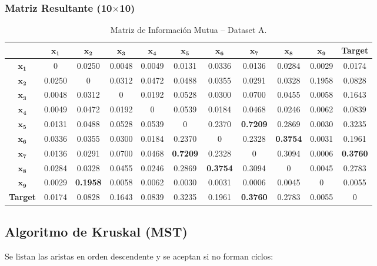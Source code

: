 \documentclass[12pt,a4paper]{article}
\begin{document}
\subsubsection{Matriz Resultante (10$\times$10)}

\begin{table}[H]
    \centering
    \footnotesize
    \begin{tabular}{c|cccccccccc}
        \toprule
        & $\mathbf{x_1}$ & $\mathbf{x_2}$ & $\mathbf{x_3}$ & $\mathbf{x_4}$ & $\mathbf{x_5}$ & $\mathbf{x_6}$ & $\mathbf{x_7}$ & $\mathbf{x_8}$ & $\mathbf{x_9}$ & \textbf{Target} \\
        \midrule
        $\mathbf{x_1}$ & 0 & 0.0250 & 0.0048 & 0.0049 & 0.0131 & 0.0336 & 0.0136 & 0.0284 & 0.0029 & 0.0174 \\
        $\mathbf{x_2}$ & 0.0250 & 0 & 0.0312 & 0.0472 & 0.0488 & 0.0355 & 0.0291 & 0.0328 & 0.1958 & 0.0828 \\
        $\mathbf{x_3}$ & 0.0048 & 0.0312 & 0 & 0.0192 & 0.0528 & 0.0300 & 0.0700 & 0.0455 & 0.0058 & 0.1643 \\
        $\mathbf{x_4}$ & 0.0049 & 0.0472 & 0.0192 & 0 & 0.0539 & 0.0184 & 0.0468 & 0.0246 & 0.0062 & 0.0839 \\
        $\mathbf{x_5}$ & 0.0131 & 0.0488 & 0.0528 & 0.0539 & 0 & 0.2370 & \textbf{0.7209} & 0.2869 & 0.0030 & 0.3235 \\
        $\mathbf{x_6}$ & 0.0336 & 0.0355 & 0.0300 & 0.0184 & 0.2370 & 0 & 0.2328 & \textbf{0.3754} & 0.0031 & 0.1961 \\
        $\mathbf{x_7}$ & 0.0136 & 0.0291 & 0.0700 & 0.0468 & \textbf{0.7209} & 0.2328 & 0 & 0.3094 & 0.0006 & \textbf{0.3760} \\
        $\mathbf{x_8}$ & 0.0284 & 0.0328 & 0.0455 & 0.0246 & 0.2869 & \textbf{0.3754} & 0.3094 & 0 & 0.0045 & 0.2783 \\
        $\mathbf{x_9}$ & 0.0029 & \textbf{0.1958} & 0.0058 & 0.0062 & 0.0030 & 0.0031 & 0.0006 & 0.0045 & 0 & 0.0055 \\
        \textbf{Target} & 0.0174 & 0.0828 & 0.1643 & 0.0839 & 0.3235 & 0.1961 & \textbf{0.3760} & 0.2783 & 0.0055 & 0 \\
        \bottomrule
    \end{tabular}
    \caption{Matriz de Información Mutua -- Dataset A.}
\end{table}

\subsection{Algoritmo de Kruskal (MST)}
Se listan las aristas en orden descendente y se aceptan si no forman ciclos:
\end{document}
